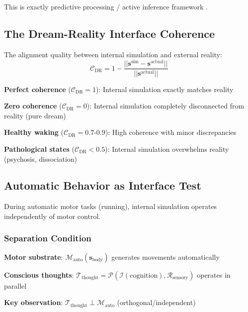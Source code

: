 \documentclass[11pt,onecolumn]{article}
\begin{document}
This is exactly predictive processing / active inference framework \citep{friston2010free,clark2013whatever}.

\subsection{The Dream-Reality Interface Coherence}

\begin{definition}
The alignment quality between internal simulation and external reality:
\begin{equation}
\mathcal{C}_{\text{DR}} = 1 - \frac{||\mathbf{s}^{\text{sim}} - \mathbf{s}^{\text{actual}}||}{||\mathbf{s}^{\text{actual}}||}
\end{equation}
\end{definition}

\textbf{Perfect coherence} ($\mathcal{C}_{\text{DR}} = 1$): Internal simulation exactly matches reality

\textbf{Zero coherence} ($\mathcal{C}_{\text{DR}} = 0$): Internal simulation completely disconnected from reality (pure dream)

\textbf{Healthy waking} ($\mathcal{C}_{\text{DR}} = 0.7$-$0.9$): High coherence with minor discrepancies

\textbf{Pathological states} ($\mathcal{C}_{\text{DR}} < 0.5$): Internal simulation overwhelms reality (psychosis, dissociation)

\subsection{Automatic Behavior as Interface Test}

During automatic motor tasks (running), internal simulation operates independently of motor control.

\subsubsection{Separation Condition}

\textbf{Motor substrate}: $\mathcal{M}_{\text{auto}}(\mathbf{s}_{\text{body}})$ generates movements automatically

\textbf{Conscious thoughts}: $\mathcal{T}_{\text{thought}} = \mathcal{P}(\mathcal{I}(\text{cognition}), \mathcal{R}_{\text{sensory}})$ operates in parallel

\textbf{Key observation}: $\mathcal{T}_{\text{thought}} \perp \mathcal{M}_{\text{auto}}$ (orthogonal/independent)
\end{document}
